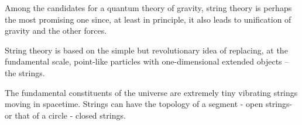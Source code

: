 \documentclass[draft]{phd}
\begin{document}
Among the candidates 
for a quantum theory of gravity, string theory is perhaps the most promising one since, at least in principle, it also leads to unification of gravity and the other forces.

String theory is based on the simple but revolutionary idea of replacing, at the fundamental scale, point-like particles with one-dimensional extended objects -- the strings.
		
				\begin{figure}[h]
					\centering
				\end{figure}
The fundamental constituents of the universe are extremely tiny vibrating strings moving in spacetime. Strings can have the topology of a segment  - open strings- 
 or that of a circle - closed strings.
%	
	
\end{document}
